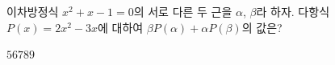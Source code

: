 이차방정식 $x^2+x-1=0$의 서로 다른 두 근을 $\alpha$, $\beta$라 하자. 다항식 $P(x)=2x^2-3x$에 대하여 $\beta P(\alpha)+\alpha P(\beta)$의 값은?
\begin{choices32}{$5$}{$6$}{$7$}{$8$}{$9$}\end{choices32}
